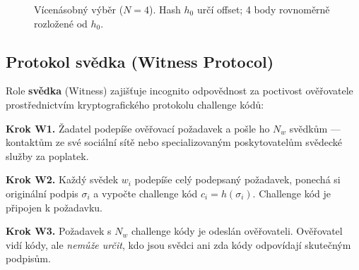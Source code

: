 \documentclass[11pt,a4paper,twocolumn]{article}
\begin{document}
\begin{figure}[ht]
\centering
{}
\caption{Vícenásobný výběr ($N{=}4$). Hash $h_0$ určí offset; 4 body rovnoměrně rozložené od $h_0$.}
\label{fig:multipoint}
\end{figure}

\subsection{Protokol svědka (Witness Protocol)}

Role \textbf{svědka} (Witness) zajišťuje incognito odpovědnost za poctivost ověřovatele prostřednictvím kryptografického protokolu challenge kódů:

\textbf{Krok W1.} Žadatel podepíše ověřovací požadavek a pošle ho $N_w$ svědkům --- kontaktům ze své sociální sítě nebo specializovaným poskytovatelům svědecké služby za poplatek.

\textbf{Krok W2.} Každý svědek $w_i$ podepíše celý podepsaný požadavek, ponechá si originální podpis $\sigma_i$ a vypočte challenge kód $c_i = h(\sigma_i)$. Challenge kód je připojen k požadavku.

\textbf{Krok W3.} Požadavek s $N_w$ challenge kódy je odeslán ověřovateli. Ověřovatel vidí kódy, ale \emph{nemůže určit}, kdo jsou svědci ani zda kódy odpovídají skutečným podpisům.
\end{document}
